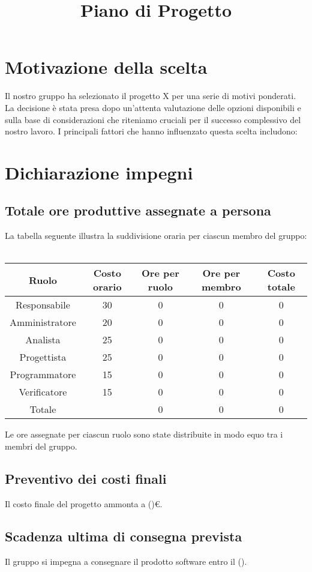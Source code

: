 \documentclass[12pt]{article}
\title{Piano di Progetto}
\date{}
\begin{document}
\maketitle

\section{Motivazione della scelta}
Il nostro gruppo ha selezionato il progetto X per una serie di motivi ponderati. La decisione è stata presa dopo un'attenta valutazione delle opzioni disponibili e sulla base di considerazioni che riteniamo cruciali per il successo complessivo del nostro lavoro. I principali fattori che hanno influenzato questa scelta includono:

\section{Dichiarazione impegni}

\subsection{Totale ore produttive assegnate a persona}
La tabella seguente illustra la suddivisione oraria per ciascun membro del gruppo:\\ \\
\begin{tabular}{|c|c|c|c|c|}
\hline
Ruolo & Costo orario & Ore per ruolo & Ore per membro & Costo totale \\
\hline
\hline
Responsabile & 30 & 0 & 0 & 0 \\
Amministratore & 20 & 0 & 0 & 0 \\
Analista & 25 & 0 & 0 & 0 \\
Progettista & 25 & 0 & 0 & 0 \\
Programmatore & 15 & 0 & 0 & 0 \\
Verificatore & 15 & 0 & 0 & 0 \\
\hline
\hline
Totale &  & 0 & 0 & 0 \\
\hline
\end{tabular}
Le ore assegnate per ciascun ruolo sono state distribuite in modo equo tra i membri del gruppo.

\subsection{Preventivo dei costi finali}
Il costo finale del progetto ammonta a ()€.

\subsection{Scadenza ultima di consegna prevista}
Il gruppo si impegna a consegnare il prodotto software entro il ().
\end{document}
